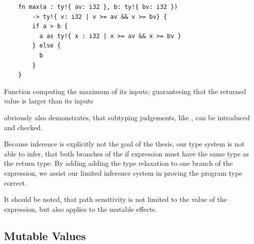 \documentclass[twoside, english]{sdqthesis}
\theoremstyle{definition}
\begin{document}
\begin{listing}[ht]
  \begin{verbatim}
    fn max(a : ty!{ av: i32 }, b: ty!{ bv: i32 })
        -> ty!{ v: i32 | v >= av && v >= bv} {
        if a > b {
          a as ty!{ x : i32 | x >= av && x >= bv }
        } else {
          b
        }
    }
  \end{verbatim}
  \caption{Function computing the maximum of its inputs; guaranteeing that the returned value is larger than its inputs}
  \label{lst:max-path-sensitive}
\end{listing}


 obviously also demonstrates, that subtyping judgements, like , can be introduced and checked.

Because inference is explicitly not the goal of the thesis, our type system is not able to infer, that both branches of the if expression must have the same type as the return type. By adding adding the type relaxation to one branch of the expression, we assist our limited inference system in proving the program type correct.

It should be noted, that path sensitivity is not limited to the value of the expression, but also applies to the mutable effects.

\subsection{Mutable Values}
\end{document}
